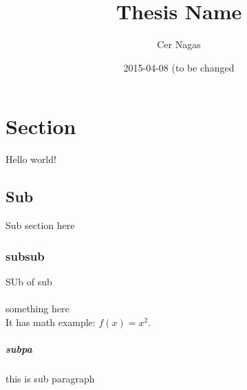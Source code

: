\documentclass{article}
\title{Thesis Name}
\date{2015-04-08 (to be changed}
\author{Cer Nagas}
\begin{document}
  \maketitle
  \newpage
  
  \tableofcontents
  \listoffigures
  \newpage
  
  \section{Section}
  Hello world!
  
  \subsection{Sub}
  Sub section here
  
  \subsubsection{subsub}
  SUb of sub
  
  \paragraph{}
  something here\\
  It has math example: $f(x)=x^2$.
  
  \subparagraph{subpa}
  this is sub paragraph
  
\end{document}

